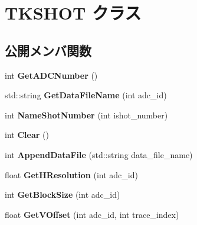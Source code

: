 \hypertarget{class_t_k_s_h_o_t}{}\section{T\+K\+S\+H\+OT クラス}
\label{class_t_k_s_h_o_t}
\subsection*{公開メンバ関数}
\begin{DoxyCompactItemize}
\item 
\mbox{\label{class_t_k_s_h_o_t_af116d5e195d9853c78d3e4ddb00e2c57}} 
int {\bfseries Get\+A\+D\+C\+Number} ()
\item 
\mbox{\label{class_t_k_s_h_o_t_a1314067d1c3ec702c29866ad124048eb}} 
std\+::string {\bfseries Get\+Data\+File\+Name} (int adc\+\_\+id)
\item 
\mbox{\label{class_t_k_s_h_o_t_a8f91dff3640a574152c6fb3c5e542f62}} 
int {\bfseries Name\+Shot\+Number} (int ishot\+\_\+number)
\item 
\mbox{\label{class_t_k_s_h_o_t_a8edc2c710c0dd04d619ddb5f105c41fe}} 
int {\bfseries Clear} ()
\item 
\mbox{\label{class_t_k_s_h_o_t_ae8f63779c8d19ad6afab9e02ba066487}} 
int {\bfseries Append\+Data\+File} (std\+::string data\+\_\+file\+\_\+name)
\item 
\mbox{\label{class_t_k_s_h_o_t_a055079afd19a206d3f525b6c2cbd5d75}} 
float {\bfseries Get\+H\+Resolution} (int adc\+\_\+id)
\item 
\mbox{\label{class_t_k_s_h_o_t_abc9d569e4f7136cd0b3f56b8e0e2e8cd}} 
int {\bfseries Get\+Block\+Size} (int adc\+\_\+id)
\item 
\mbox{\label{class_t_k_s_h_o_t_ab43a63e3fe0f6797ee97eed0091339ba}} 
float {\bfseries Get\+V\+Offset} (int adc\+\_\+id, int trace\+\_\+index)
\item 
\mbox{\label{class_t_k_s_h_o_t_aafff8aa391415312187f769a4678c82f}} 

\end{DoxyCompactItemize}
